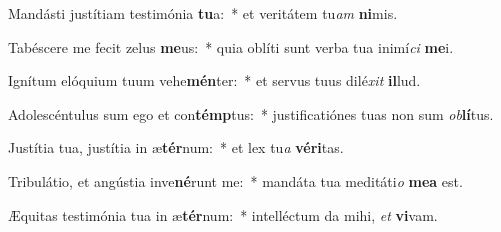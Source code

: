 \item Mandásti justítiam testimónia \textbf{tu}a:~* et veritátem tu\textit{am} \textbf{ni}mis.
\item Tabéscere me fecit zelus \textbf{me}us:~* quia oblíti sunt verba tua inimí\textit{ci} \textbf{me}i.
\item Ignítum elóquium tuum vehe\textbf{mén}ter:~* et servus tuus dilé\textit{xit} \textbf{il}lud.
\item Adolescéntulus sum ego et con\textbf{témp}tus:~* justificatiónes tuas non sum \textit{ob}\textbf{lí}tus.
\item Justítia tua, justítia in æ\textbf{tér}num:~* et lex tu\textit{a} \textbf{vé}\textbf{ri}tas.
\item Tribulátio, et angústia inve\textbf{né}runt me:~* mandáta tua meditáti\textit{o} \textbf{me}\textbf{a} est.
\item Æquitas testimónia tua in æ\textbf{tér}num:~* intelléctum da mihi, \textit{et} \textbf{vi}vam.
